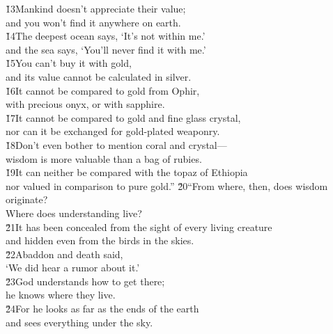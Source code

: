 \begin{poetry}
\poeml \v{13}Mankind doesn't appreciate their value; \\
\poemll    and you won't find it anywhere on earth. \\
\poeml \v{14}The deepest ocean says, `It's not within me.' \\
\poemll    and the sea says, `You'll never find it with me.' \\
\poeml \v{15}You can't buy it with gold, \\
\poemll    and its value cannot be calculated in silver. \\
\poeml \v{16}It cannot be compared to gold from Ophir, \\
\poemll    with precious onyx, or with sapphire. \\
\poeml \v{17}It cannot be compared to gold and fine glass crystal, \\
\poemll    nor can it be exchanged for gold-plated weaponry. \\
\poeml \v{18}Don't even bother to mention coral and crystal--- \\
\poemll    wisdom is more valuable than a bag of rubies. \\
\poeml \v{19}It can neither be compared with the topaz of Ethiopia \\
\poemll    nor valued in comparison to pure gold.''
\poeml \v{20}``From where, then, does wisdom originate? \\
\poemll    Where does understanding live? \\
\poeml \v{21}It has been concealed from the sight of every living creature \\
\poemll    and hidden even from the birds in the skies. \\
\poeml \v{22}Abaddon and death said, \\
\poemll    `We did hear a rumor about it.' \\
\poeml \v{23}God understands how to get there; \\
\poemll    he knows where they live. \\
\poeml \v{24}For he looks as far as the ends of the earth \\
\poemll    and sees everything under the sky. \\

\end{poetry}
